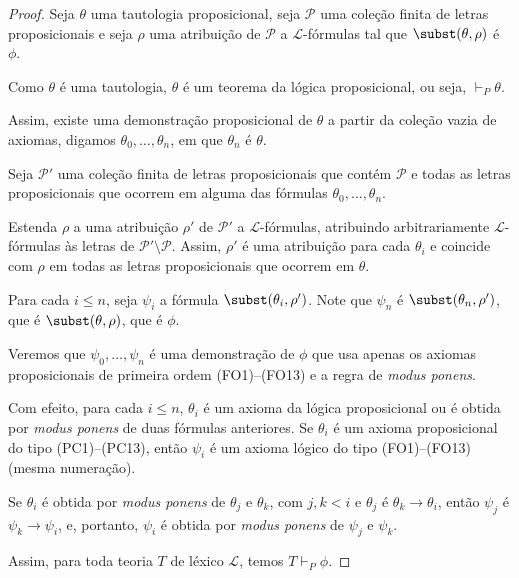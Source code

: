 \begin{proof}
    Seja $\theta$ uma tautologia proposicional, seja $\mathcal P$ uma coleção finita de letras proposicionais e seja $\rho$ uma atribuição de $\mathcal P$ a $\mathcal L$-fórmulas tal que $\subst(\theta, \rho)$ é $\phi$.

    Como $\theta$ é uma tautologia, $\theta$ é um teorema da lógica proposicional, ou seja, $\vdash_P \theta$.

    Assim, existe uma demonstração proposicional de $\theta$ a partir da coleção vazia de axiomas, digamos $\theta_0, \dots, \theta_n$, em que $\theta_n$ é $\theta$.

    Seja $\mathcal P'$ uma coleção finita de letras proposicionais que contém $\mathcal P$ e todas as letras proposicionais que ocorrem em alguma das fórmulas $\theta_0,\dots,\theta_n$.

    Estenda $\rho$ a uma atribuição $\rho'$ de $\mathcal P'$ a $\mathcal L$-fórmulas, atribuindo arbitrariamente $\mathcal L$-fórmulas às letras de $\mathcal P'\setminus\mathcal P$.
    Assim, $\rho'$ é uma atribuição para cada $\theta_i$ e coincide com $\rho$ em todas as letras proposicionais que ocorrem em $\theta$.

    Para cada $i\leq n$, seja $\psi_i$ a fórmula $\subst(\theta_i, \rho')$.
    Note que $\psi_n$ é $\subst(\theta_n, \rho')$, que é $\subst(\theta, \rho)$, que é $\phi$.

    Veremos que $\psi_0, \dots, \psi_n$ é uma demonstração de $\phi$ que usa apenas os axiomas proposicionais de primeira ordem (FO1)--(FO13) e a regra de \emph{modus ponens}.

    Com efeito, para cada $i\leq n$, $\theta_i$ é um axioma da lógica proposicional ou é obtida por \emph{modus ponens} de duas fórmulas anteriores.
    Se $\theta_i$ é um axioma proposicional do tipo (PC1)--(PC13), então $\psi_i$ é um axioma lógico do tipo (FO1)--(FO13) (mesma numeração).

    Se $\theta_i$ é obtida por \emph{modus ponens} de $\theta_j$ e $\theta_k$, com $j, k<i$ e $\theta_j$ é $\theta_k \rightarrow \theta_i$, então $\psi_j$ é $\psi_k \rightarrow \psi_i$, e, portanto, $\psi_i$ é obtida por \emph{modus ponens} de $\psi_j$ e $\psi_k$.

    Assim, para toda teoria $T$ de léxico $\mathcal L$, temos $T\vdash_P \phi$.
\end{proof}


